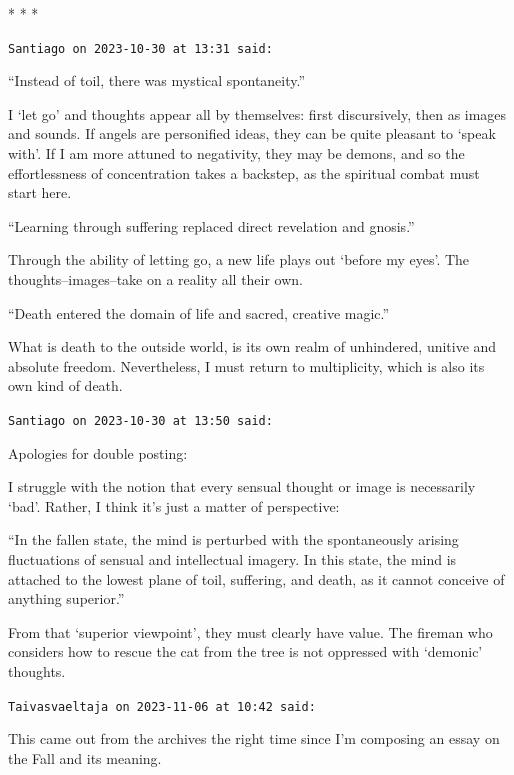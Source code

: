 
\begin{center}* * *\end{center}

\begin{footnotesize}
\begin{sffamily}
\texttt{Santiago on 2023-10-30 at 13:31 said:}

``Instead of toil, there was mystical spontaneity.''

I `let go' and thoughts appear all by themselves: first discursively, then as images and sounds. If angels are personified ideas, they can be quite pleasant to `speak with'. If I am more attuned to negativity, they may be demons, and so the effortlessness of concentration takes a backstep, as the spiritual combat must start here.

``Learning through suffering replaced direct revelation and gnosis.''

Through the ability of letting go, a new life plays out `before my eyes'. The thoughts--images--take on a reality all their own.

``Death entered the domain of life and sacred, creative magic.''

What is death to the outside world, is its own realm of unhindered, unitive and absolute freedom. Nevertheless, I must return to multiplicity, which is also its own kind of death.

\hfill

\texttt{Santiago on 2023-10-30 at 13:50 said:}

Apologies for double posting:

I struggle with the notion that every sensual thought or image is necessarily `bad'. Rather, I think it's just a matter of perspective:

``In the fallen state, the mind is perturbed with the spontaneously arising fluctuations of sensual and intellectual imagery. In this state, the mind is attached to the lowest plane of toil, suffering, and death, as it cannot conceive of anything superior.''

From that `superior viewpoint', they must clearly have value. The fireman who considers how to rescue the cat from the tree is not oppressed with `demonic' thoughts.

\hfill

\texttt{Taivasvaeltaja on 2023-11-06 at 10:42 said:}

This came out from the archives the right time since I'm composing an essay on the Fall and its meaning.


\hfill

\end{sffamily}
\end{footnotesize}

